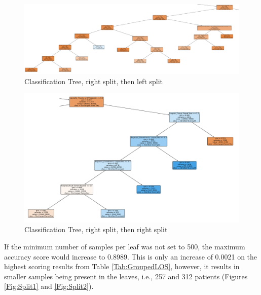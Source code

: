 \documentclass[../thesis.tex]{subfiles}
\begin{document}
\begin{landscape}
\begin{figure}
    \centering
    \includegraphics[scale =0.5]{Chapter4/Figures/Split3.png}
    \caption{Classification Tree, right split, then left split}
    \label{fig:Class3}
\end{figure}
\begin{figure}
    \centering
    \includegraphics[scale=0.8]{Chapter4/Figures/Split4.png}
    \caption{Classification Tree, right split, then right split}
    \label{fig:Class4}
\end{figure}
\end{landscape}

If the minimum number of samples per leaf was not set to 500, the maximum accuracy score would increase to 0.8989. This is only an increase of 0.0021 on the highest scoring results from Table \ref{Tab:GroupedLOS}, however, it results in smaller samples being present in the leaves, i.e., 257 and 312 patients (Figures \ref{Fig:Split1} and \ref{Fig:Split2}).
\end{document}
